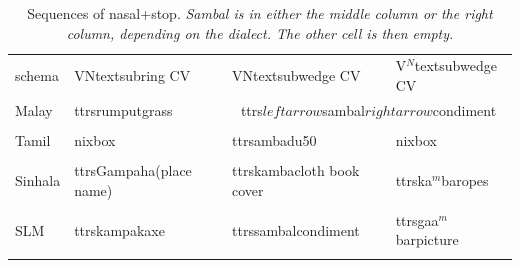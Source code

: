 \documentclass[a4paper,10pt]{article}
\begin{document}
\begin{table}
\begin{tabular}{llll}
schema & VNtextsubring CV & VNtextsubwedge CV & V$^N$textsubwedge CV \\
%
Malay &  ttrs{rumput}{grass} & \multicolumn{2}{c}{ttrs{$leftarrow$sambal$rightarrow$}{condiment}}\\\\
%
Tamil & nixbox & ttrs{ambadu}{50} &  nixbox  \\\\
%
Sinhala & ttrs{Gampaha}{(place name)} & ttrs{kamba}{cloth book cover} & ttrs{ka$^m$ba}{ropes} \\\\
%
SLM & ttrs{kampak}{axe} & ttrs{sambal}{condiment} & ttrs{gaa$^m$bar}{picture} \\\\
\end{tabular}
\caption{Sequences of nasal+stop. \em Sambal \em is in either the middle column or the right column, depending on the dialect. The other cell is then empty.}
\label{tab:NC}
\end{table}

% 
% 
\end{document}
